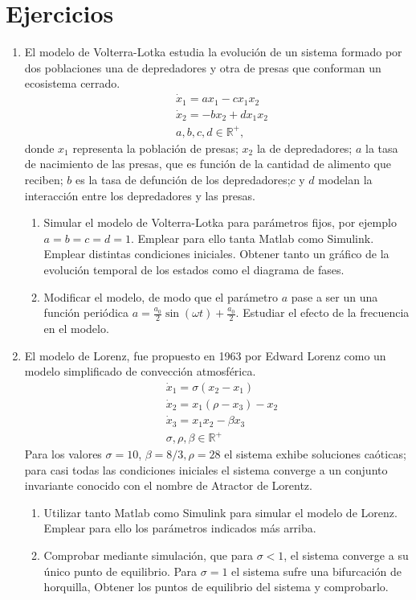 \section*{Ejercicios}
\begin{enumerate}
\item El modelo de Volterra-Lotka estudia la evolución de un sistema formado por dos poblaciones una de depredadores y otra de presas que conforman un ecosistema cerrado.
\begin{align*}
&\dot x_1 = ax_1-cx_1x_2\\
&\dot x_2 =-bx_2 + dx_1x_2\\
&a,b,c,d \in \mathbb{R}^+,
\end{align*}
donde $x_1$ representa la población de presas; $x_2$ la de depredadores; $a$ la tasa de nacimiento de las presas, que es función de la cantidad de alimento que reciben; $b$ es la tasa de defunción de los depredadores;$c$ y $d$ modelan la interacción entre los depredadores y las presas.

\begin{enumerate}
\item Simular el modelo de Volterra-Lotka para parámetros fijos, por ejemplo $a=b=c=d=1$. Emplear para ello tanta Matlab como Simulink. Emplear distintas condiciones iniciales. Obtener tanto un gráfico de la evolución temporal de los estados como el diagrama de fases.
\item Modificar el modelo, de modo que el parámetro $a$ pase a ser un una función periódica $a = \frac{a_0}{2}\sin(\omega t)+\frac{a_0}{2}$. Estudiar el efecto de la frecuencia en el modelo.
\end{enumerate}
\item El modelo de Lorenz, fue propuesto en 1963 por Edward Lorenz  como un modelo simplificado de convección atmosférica.
\begin{align*}
&\dot x_1 = \sigma (x_2 -x_1)\\
&\dot x_2 = x_1 (\rho -x_3) - x_2\\
&\dot x_3 = x_1x_2 -\beta x_3\\
& \sigma, \rho, \beta \in \mathbb{R}^+
\end{align*}
Para los valores $\sigma  = 10$, $\beta = 8/3, \rho = 28$ el sistema exhibe soluciones caóticas; para casi todas las condiciones iniciales el sistema converge a un conjunto invariante conocido con el nombre de Atractor de Lorentz.
\begin{enumerate}
\item Utilizar tanto Matlab como  Simulink para simular el modelo de Lorenz. Emplear para ello los parámetros indicados más arriba.
\item Comprobar mediante simulación,  que para $\sigma < 1$, el sistema converge a su único  punto de equilibrio. Para $\sigma = 1$ el sistema sufre una bifurcación de horquilla, Obtener los puntos de equilibrio del sistema y comprobarlo.
 \end{enumerate}
 

\end{enumerate}
